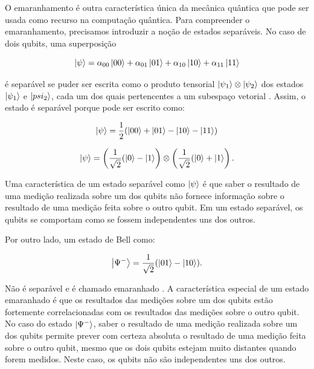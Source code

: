O emaranhamento é outra característica única da mecânica quântica que pode ser usada como recurso na computação quântica. Para compreender o emaranhamento, precisamos introduzir a noção de estados separáveis. No caso de dois qubits, uma superposição 

\begin{center}
\begin{equation}
\ket{\psi} = \alpha_{00}\ket{00} + \alpha_{01}\ket{01} +\alpha_{10}\ket{10} + \alpha_{11}\ket{11}   
\end{equation}
\end{center}

\noindent é separável se puder ser escrita como o produto tensorial $\ket{\psi_1}\otimes\ket{\psi_2}$ dos estados $\ket{\psi_1}$ e $\ket{psi_2}$, cada um dos quais pertencentes a um subespaço vetorial \cite{Wong2022IntroductionClassicalQuantum}. Assim, o estado é separável porque pode ser escrito como: 

\begin{center}
\begin{equation}
\ket{\psi} = \frac{1}{2}(\ket{00} + \ket{01} - \ket{10} - \ket{11})   
\end{equation}
\end{center}

\begin{center}
\begin{equation}
\ket{\psi} = \left(\frac{1}{\sqrt{2}}(\ket{0} - \ket{1}\right)\otimes\left(\frac{1}{\sqrt{2}}(\ket{0} + \ket{1}\right).   
\end{equation}
\end{center}

Uma característica de um estado separável como $\ket{\psi}$ é que saber o resultado de uma medição realizada sobre um dos qubits não fornece informação sobre o resultado de uma medição feita sobre o outro qubit. Em um estado separável, os qubits se comportam como se fossem independentes uns dos outros.  

Por outro lado, um estado de Bell como:

\begin{center} \label{eq:Bell}
\begin{equation}
\ket{\Psi^-} = \frac{1}{\sqrt{2}}(\ket{01} - \ket{10}). 
\end{equation}
\end{center}

Não é separável e é chamado emaranhado \cite{Wong2022IntroductionClassicalQuantum}. A característica especial de um estado emaranhado é que os resultados das medições sobre um dos qubits estão fortemente correlacionadas com os resultados das medições sobre o outro qubit. No caso do estado $\ket{\Psi^-}$, saber o resultado de uma medição realizada sobre um dos qubits permite prever com certeza absoluta o resultado de uma medição feita sobre o outro qubit, mesmo que os dois qubits estejam muito distantes quando forem medidos. Neste caso, os qubits não são independentes uns dos outros.  


